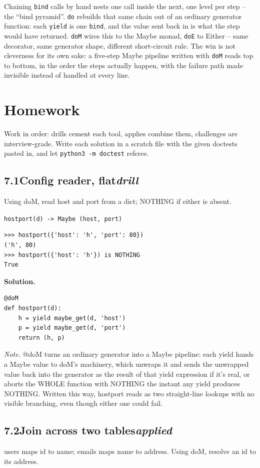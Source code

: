\documentclass[10pt,letterpaper]{book}
\begin{document}
Chaining \texttt{bind} calls by hand nests one call inside the next, one
level per step -- the ``bind pyramid''. \texttt{do} rebuilds that same
chain out of an ordinary generator function: each \texttt{yield} is one
\texttt{bind}, and the value sent back in is what the step would have
returned. \texttt{doM} wires this to the Maybe monad, \texttt{doE} to
Either -- same decorator, same generator shape, different short-circuit
rule. The win is not cleverness for its own sake: a five-step Maybe
pipeline written with \texttt{doM} reads top to bottom, in the order the
steps actually happen, with the failure path made invisible instead of
handled at every line.
\section{Homework}
Work in order: drills cement each tool, applies combine them,
challenges are interview-grade. Write each solution in a scratch file with
the given doctests pasted in, and let \texttt{python3 -m doctest} referee.
\subsection*{7.1\quad Config reader, flat\hfill\textnormal{\textit{drill}}}
Using doM, read host and port from a dict; NOTHING if either is absent.

\noindent\texttt{hostport(d) -> Maybe (host, port)}
\begin{lstlisting}[style=ex]
>>> hostport({'host': 'h', 'port': 80})
('h', 80)
>>> hostport({'host': 'h'}) is NOTHING
True
\end{lstlisting}
\noindent\textbf{Solution.}
\begin{lstlisting}[style=code]
@doM
def hostport(d):
    h = yield maybe_get(d, 'host')
    p = yield maybe_get(d, 'port')
    return (h, p)
\end{lstlisting}
\noindent\textit{Note.} @doM turns an ordinary generator into a Maybe pipeline: each yield hands a Maybe value to doM's machinery, which unwraps it and sends the unwrapped value back into the generator as the result of that yield expression if it's real, or aborts the WHOLE function with NOTHING the instant any yield produces NOTHING. Written this way, hostport reads as two straight-line lookups with no visible branching, even though either one could fail.

\subsection*{7.2\quad Join across two tables\hfill\textnormal{\textit{applied}}}
users maps id to name; emails maps name to address. Using doM, resolve an id to its address.
\end{document}
